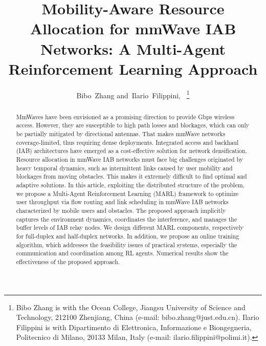 \documentclass[lettersize,journal]{IEEEtran}
\begin{document}
\setlength{\abovedisplayskip}{2pt}
\setlength{\belowdisplayskip}{2pt}

\title{Mobility-Aware Resource Allocation for mmWave IAB Networks: A Multi-Agent Reinforcement Learning Approach}

\author{Bibo~Zhang
and~Ilario~Filippini,~%
\thanks{Bibo Zhang is with the Ocean College, Jiangsu University of Science and Technology, 212100 Zhenjiang, China (e-mail: bibo.zhang@just.edu.cn). Ilario Filippini is with Dipartimento di Elettronica, Informazione e Biongegneria, Politecnico di Milano, 20133 Milan,
Italy (e-mail: ilario.filippini@polimi.it).} %
}




\maketitle

\begin{abstract}
MmWaves have been envisioned as a promising direction to provide Gbps wireless access. However, they are susceptible to high path losses and blockages, which can only be partially mitigated by directional antennas. That makes mmWave networks coverage-limited, thus requiring dense deployments. Integrated access and backhaul (IAB) architectures have emerged as a cost-effective solution for network densification. Resource allocation in mmWave IAB networks must face big challenges originated by heavy temporal dynamics, such as intermittent links caused by user mobility and blockages from moving obstacles. This makes it extremely difficult to find optimal and adaptive solutions.
In this article, exploiting the distributed structure of the problem, we propose a Multi-Agent Reinforcement Learning (MARL) framework to optimize user throughput via flow routing and link scheduling in mmWave IAB networks characterized by mobile users and obstacles. The proposed approach implicitly captures the environment dynamics, coordinates the interference, and manages the buffer levels of IAB relay nodes. We design different MARL components, respectively for full-duplex and half-duplex networks. In addition, we propose an online training algorithm, which addresses the feasibility issues of practical systems, especially the communication and coordination among RL agents. Numerical results show the effectiveness of the proposed approach.
\end{abstract}
\end{document}
